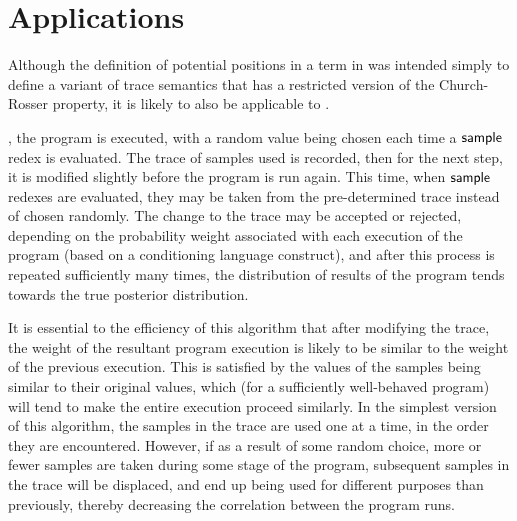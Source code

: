\section{Applications}
\label{sec:applications}
Although the definition of potential positions in a term in  was intended simply to define a variant of trace semantics that has a restricted version of the Church-Rosser property, it is likely to also be applicable to .


,
the program is executed, with a random value being chosen each time a $\mathsf{sample}$ redex is evaluated. The trace of samples used is recorded, then for the next step, it is modified slightly before the program is run again. This time, when $\mathsf{sample}$ redexes are evaluated, they may be taken from the pre-determined trace instead of chosen randomly. The change to the trace may be accepted or rejected, depending on the probability weight associated with each execution of the program (based on a conditioning language construct), and after this process is repeated sufficiently many times, the distribution of results of the program tends towards the true posterior distribution.

It is essential to the efficiency of this algorithm that after modifying the trace, the weight of the resultant program execution is likely to be similar to the weight of the previous execution. This is satisfied by the values of the samples being similar to their original values, which (for a sufficiently well-behaved program) will tend to make the entire execution proceed similarly. In the simplest version of this algorithm, the samples in the trace are used one at a time, in the order they are encountered. However, if as a result of some random choice, more or fewer samples are taken during some stage of the program, subsequent samples in the trace will be displaced, and end up being used for different purposes than previously, thereby decreasing the correlation between the program runs.

